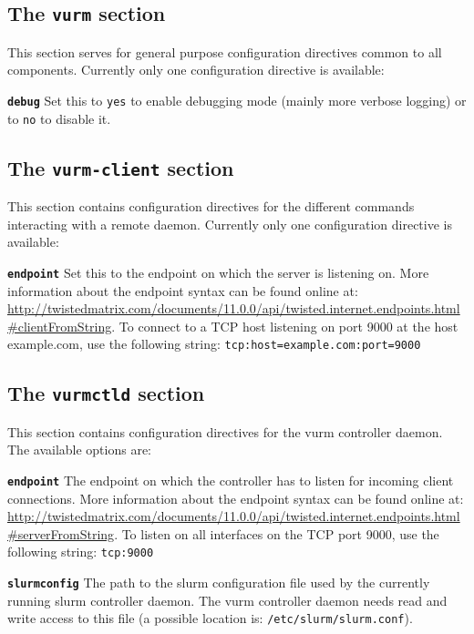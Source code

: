 \subsection{The \texttt{vurm} section}

This section serves for general purpose configuration directives common to all components. Currently only one configuration directive is available:

\texttt{\textbf{debug}} Set this to \texttt{yes} to enable debugging mode (mainly more verbose logging) or to \texttt{no} to disable it.

\subsection{The \texttt{vurm-client} section}

This section contains configuration directives for the different commands interacting with a remote daemon. Currently only one configuration directive is available:

\textbf{\texttt{endpoint}} Set this to the endpoint on which the server is listening on. More information about the endpoint syntax can be found online at: \url{http://twistedmatrix.com/documents/11.0.0/api/twisted.internet.endpoints.html#clientFromString}. To connect to a TCP host listening on port 9000 at the host example.com, use the following string: \texttt{tcp:host=example.com:port=9000}

\subsection{The \texttt{vurmctld} section}

This section contains configuration directives for the \gls{vurm} controller daemon. The available options are:

\textbf{\texttt{endpoint}} The endpoint on which the controller has to listen for incoming client connections. More information about the endpoint syntax can be found online at: \url{http://twistedmatrix.com/documents/11.0.0/api/twisted.internet.endpoints.html#serverFromString}. To listen on all interfaces on the TCP port 9000, use the following string: \texttt{tcp:9000}

\textbf{\texttt{slurmconfig}} The path to the \gls{slurm} configuration file used by the currently running \gls{slurm} controller daemon. The \gls{vurm} controller daemon needs read and write access to this file (a possible location is: \texttt{/etc/slurm/slurm.conf}).

